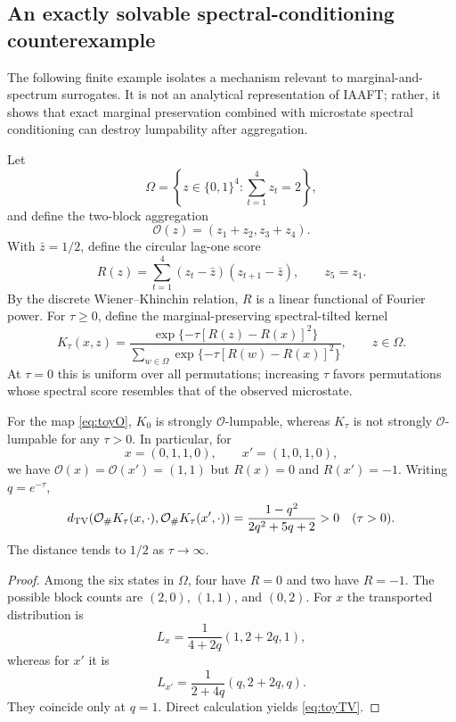 \subsection{An exactly solvable spectral-conditioning counterexample}\label{sec:counterexample}

The following finite example isolates a mechanism relevant to marginal-and-spectrum surrogates. It is not an analytical representation of IAAFT; rather, it shows that exact marginal preservation combined with microstate spectral conditioning can destroy lumpability after aggregation.

Let
\[
\Omega=\left\{z\in\{0,1\}^{4}:\sum_{t=1}^{4}z_t=2\right\},
\]
and define the two-block aggregation
\begin{equation}
\mathcal O(z)=(z_1+z_2,z_3+z_4).
\label{eq:toyO}
\end{equation}
With $\bar z=1/2$, define the circular lag-one score
\begin{equation}
R(z)=\sum_{t=1}^{4}(z_t-\bar z)(z_{t+1}-\bar z),\qquad z_5=z_1.
\label{eq:toyR}
\end{equation}
By the discrete Wiener--Khinchin relation, $R$ is a linear functional of Fourier power. For $\tau\ge0$, define the marginal-preserving spectral-tilted kernel
\begin{equation}
K_\tau(x,z)=
\frac{\exp\{-\tau[R(z)-R(x)]^2\}}
{\sum_{w\in\Omega}\exp\{-\tau[R(w)-R(x)]^2\}},
\qquad z\in\Omega.
\label{eq:toykernel}
\end{equation}
At $\tau=0$ this is uniform over all permutations; increasing $\tau$ favors permutations whose spectral score resembles that of the observed microstate.

\begin{proposition}\label{prop:toy}
For the map \eqref{eq:toyO}, $K_0$ is strongly $\mathcal O$-lumpable, whereas $K_\tau$ is not strongly $\mathcal O$-lumpable for any $\tau>0$. In particular, for
\[
x=(0,1,1,0),\qquad x'=(1,0,1,0),
\]
we have $\mathcal O(x)=\mathcal O(x')=(1,1)$ but $R(x)=0$ and $R(x')=-1$. Writing $q=e^{-\tau}$,
\begin{equation}
d_{\mathrm{TV}}\!\left(\mathcal O_\#K_\tau(x,\cdot),\mathcal O_\#K_\tau(x',\cdot)\right)
=
\frac{1-q^2}{2q^2+5q+2}>0
\quad(\tau>0).
\label{eq:toyTV}
\end{equation}
The distance tends to $1/2$ as $\tau\to\infty$.
\end{proposition}

\begin{proof}
Among the six states in $\Omega$, four have $R=0$ and two have $R=-1$. The possible block counts are $(2,0)$, $(1,1)$, and $(0,2)$. For $x$ the transported distribution is
\[
L_x=\frac{1}{4+2q}(1,2+2q,1),
\]
whereas for $x'$ it is
\[
L_{x'}=\frac{1}{2+4q}(q,2+2q,q).
\]
They coincide only at $q=1$. Direct calculation yields \eqref{eq:toyTV}.
\end{proof}

